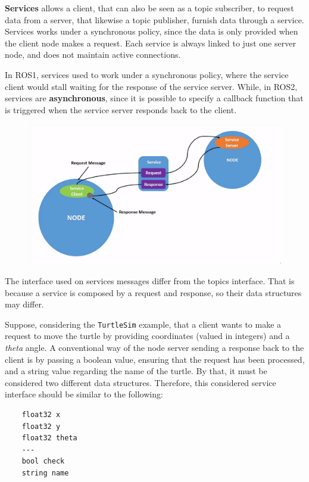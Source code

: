 \textbf{Services} allows a client, that can also be seen as a topic subscriber, to request data from a server, that likewise a topic publisher, furnish data through a service. Services works under a synchronous policy, since the data is only provided when the client node makes a request. Each service is always linked to just one server node, and does not maintain active connections.
                
In ROS1, services used to work under a synchronous policy, where the service client would stall waiting for the response of the service server. While, in ROS2, services are \textbf{asynchronous}, since it is possible to specify a callback function that is triggered when the service server responds back to the client.

\begin{figure}[H]
    \centering
    \includegraphics[width=0.7\linewidth]{images/ros2-services.png}
\end{figure}
                
                
The interface used on services messages differ from the topics interface. That is because a service is composed by a request and response, so their data structures may differ. 

Suppose, considering the \texttt{TurtleSim} example, that a client wants to make a request to move the turtle by providing coordinates (valued in integers) and a \textit{theta} angle. A conventional way of the node server sending a response back to the client is by passing a boolean value, ensuring that the request has been processed, and a string value regarding the name of the turtle. By that, it must be considered two different data structures. Therefore, this considered service interface should be similar to the following:

\begin{verbatim}
    float32 x
    float32 y
    float32 theta
    ---
    bool check
    string name
\end{verbatim}

